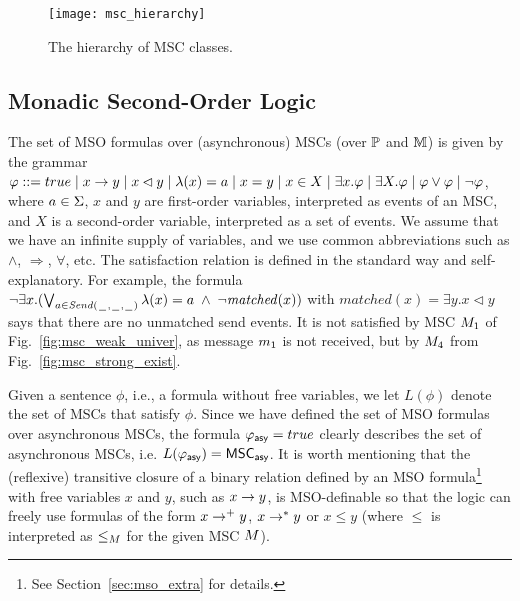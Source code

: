 \documentclass{article}
\begin{document}
\begin{figure}[h]
	\centering
	\texttt{[image: msc\_hierarchy]}
	\caption{The hierarchy of MSC classes.}
	\label{fig:msc_hierarchy}
\end{figure}

\subsection{Monadic Second-Order Logic}

The set of MSO formulas over (asynchronous) MSCs (over $\mathbb{P}$ and $\mathbb{M}$) is given by the grammar
$
\varphi ::= true \mid x \to y \mid x \lhd y \mid \lambda(x) = a \mid x = y \mid x \in X \mid \exists x.\varphi \mid \exists X.\varphi \mid \varphi \vee \varphi \mid \neg \varphi
$,
where $a \in \Sigma$, $x$ and $y$ are first-order variables, interpreted as
events of an MSC, and $X$ is a second-order variable, interpreted
as a set of events. We assume that we have an infinite supply of variables,
and we use common abbreviations such as $\wedge$, $\Rightarrow$, $\forall$, etc.
The satisfaction relation is defined in the standard way and self-explanatory.
For example, the formula $\neg\exists x.(\bigvee_{a \in {\mathit{Send}(\hspace{0.1em}\underline{\hspace{0.5em}}\hspace{0.1em},\hspace{0.1em}\underline{\hspace{0.5em}}\hspace{0.1em},\hspace{0.1em}\underline{\hspace{0.5em}}\hspace{0.1em})}} \lambda(x) = a \;\wedge\; \neg \mathit{matched}(x))$
with $\mathit{matched}(x) = \exists y.x \lhd y$
says that there are no unmatched send events.
It is not satisfied by  MSC $M_{1}$
of Fig.~\ref{fig:msc_weak_univer},
as message $m_1$ is not received,
but by $M_{4}$ from Fig.~\ref{fig:msc_strong_exist}.

Given a sentence $\phi$, i.e., a formula without free variables,
we let $L(\phi)$ denote the set of MSCs that satisfy $\phi$. Since we have defined the set of MSO formulas over asynchronous MSCs, the formula $\varphi_{\mathsf{asy}} = true$ clearly describes the set of asynchronous MSCs, i.e. $L(\varphi_{\mathsf{asy}}) = \mathsf{MSC}_{\mathsf{asy}}$. It is worth mentioning that the (reflexive) transitive closure of a binary relation defined by an MSO formula\footnote{See Section~\ref{sec:mso_extra} for details.} with free variables $x$ and $y$, such as $x \to y$, is MSO-definable so that the logic can freely use formulas of the form $x \to^+ y$, $x \to^* y$ or $x \le y$ (where $\le$ is interpreted as $\le_M$ for the given MSC $M$).
\end{document}
